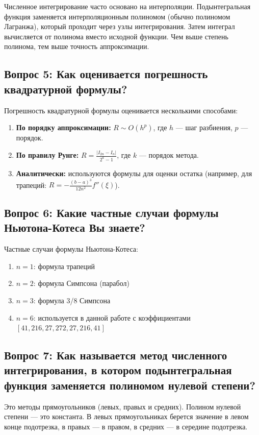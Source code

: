 \documentclass[a4paper,12pt]{article}
\begin{document}
Численное интегрирование часто основано на интерполяции. Подынтегральная функция заменяется интерполяционным полиномом (обычно полиномом Лагранжа), который проходит через узлы интегрирования. Затем интеграл вычисляется от полинома вместо исходной функции. Чем выше степень полинома, тем выше точность аппроксимации.

\subsection*{Вопрос 5: Как оценивается погрешность квадратурной формулы?}

Погрешность квадратурной формулы оценивается несколькими способами:
\begin{enumerate}
    \item \textbf{По порядку аппроксимации:} $R \sim O(h^p)$, где $h$ --- шаг разбиения, $p$ --- порядок.
    \item \textbf{По правилу Рунге:} $R = \frac{|I_{2n} - I_n|}{2^k - 1}$, где $k$ --- порядок метода.
    \item \textbf{Аналитически:} используются формулы для оценки остатка (например, для трапеций: $R = -\frac{(b-a)^3}{12n^2}f''(\xi)$).
\end{enumerate}

\subsection*{Вопрос 6: Какие частные случаи формулы Ньютона-Котеса Вы знаете?}

Частные случаи формулы Ньютона-Котеса:
\begin{enumerate}
    \item $n=1$: формула трапеций
    \item $n=2$: формула Симпсона (парабол)
    \item $n=3$: формула 3/8 Симпсона
    \item $n=6$: используется в данной работе с коэффициентами $[41, 216, 27, 272, 27, 216, 41]$
\end{enumerate}

\subsection*{Вопрос 7: Как называется метод численного интегрирования, в котором подынтегральная функция заменяется полиномом нулевой степени?}

Это методы прямоугольников (левых, правых и средних). Полином нулевой степени --- это константа. В левых прямоугольниках берется значение в левом конце подотрезка, в правых --- в правом, в средних --- в середине подотрезка.
\end{document}
